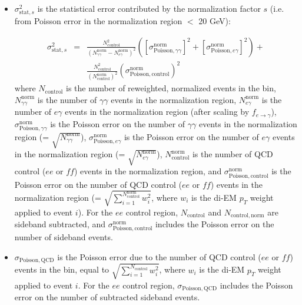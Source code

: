 \documentclass[dissertation.tex]{subfiles}
\begin{document}
\begin{itemize}

\item $\sigma_{\mathrm{stat,}s}^{2}$ is the statistical error contributed by the normalization factor $s$ (i.e. from Poisson error in the normalization region \MET $<$ 20 GeV):

\begin{eqnarray}
\sigma_{\mathrm{stat,}s}^{2} &=& \frac{N_{\mathrm{control}}^{2}}{(N_{\gamma\gamma}^{\mathrm{norm}} - N_{e\gamma}^{\mathrm{norm}})^{2}}(\left[\sigma_{\mathrm{Poisson,}\gamma\gamma}^{\mathrm{norm}}\right]^{2} + \left[\sigma_{\mathrm{Poisson,}e\gamma}^{\mathrm{norm}}\right]^{2}) + \nonumber \\
&&\frac{N_{\mathrm{control}}^{2}}{(N_{\mathrm{control}}^{\mathrm{norm}})^{2}}(\sigma_{\mathrm{Poisson,control}}^{\mathrm{norm}})^{2}
\label{eq:norm_stat_error}
\end{eqnarray}
%
where $N_{\mathrm{control}}$ is the number of reweighted, normalized events in the \MET bin, $N_{\gamma\gamma}^{\mathrm{norm}}$ is the number of $\gamma\gamma$ events in the normalization region, $N_{e\gamma}^{\mathrm{norm}}$ is the number of $e\gamma$ events in the normalization region (after scaling by $f_{e\rightarrow\gamma}$), $\sigma_{\mathrm{Poisson,}\gamma\gamma}^{\mathrm{norm}}$ is the Poisson error on the number of $\gamma\gamma$ events in the normalization region (= $\sqrt{N_{\gamma\gamma}^{\mathrm{norm}}}$), $\sigma_{\mathrm{Poisson,}e\gamma}^{\mathrm{norm}}$ is the Poisson error on the number of $e\gamma$ events in the normalization region (= $\sqrt{N_{e\gamma}^{\mathrm{norm}}}$), $N_{\mathrm{control}}^{\mathrm{norm}}$ is the number of QCD control ($ee$ or $\mathit{ff}$) events in the normalization region, and $\sigma_{\mathrm{Poisson,control}}^{\mathrm{norm}}$ is the Poisson error on the number of QCD control ($ee$ or $\mathit{ff}$) events in the normalization region (= $\sqrt{\sum_{i = 1}^{N_{\mathrm{control}}^{\mathrm{norm}}}w_{i}^{2}}$, where $w_{i}$ is the di-EM $p_{T}$ weight applied to event $i$).  For the $ee$ control region, $N_{\mathrm{control}}$ and $N_{\mathrm{control,norm}}$ are sideband subtracted, and $\sigma_{\mathrm{Poisson,control}}^{\mathrm{norm}}$ includes the Poisson error on the number of sideband events.

\item $\sigma_{\mathrm{Poisson,QCD}}$ is the Poisson error due to the number of QCD control ($ee$ or $\mathit{ff}$) events in the \MET bin, equal to $\sqrt{\sum_{i = 1}^{N_{\mathrm{control}}}w_{i}^{2}}$, where $w_{i}$ is the di-EM $p_{T}$ weight applied to event $i$.  For the $ee$ control region, $\sigma_{\mathrm{Poisson,QCD}}$ includes the Poisson error on the number of subtracted  sideband events.


\end{itemize}
\end{document}
